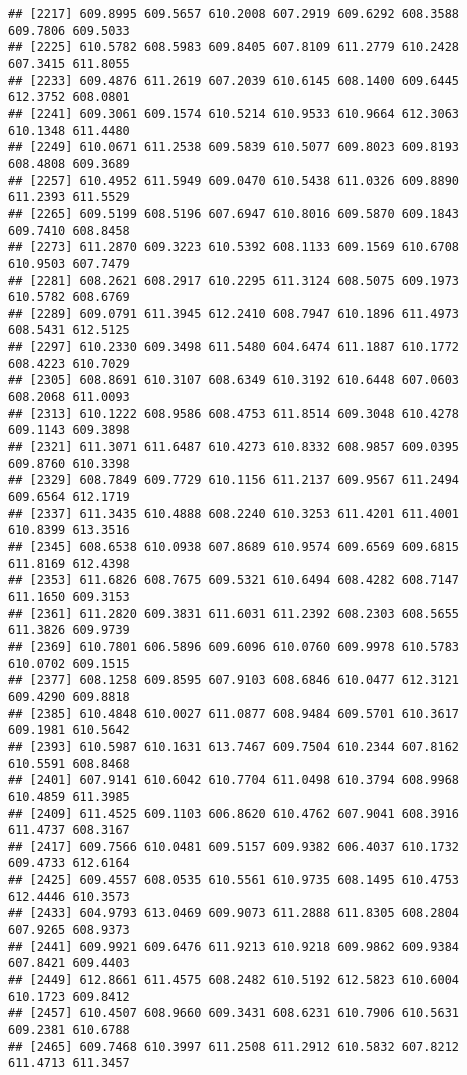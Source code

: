 \documentclass[
]{article}
\begin{document}
\begin{verbatim}
## [2217] 609.8995 609.5657 610.2008 607.2919 609.6292 608.3588 609.7806 609.5033
## [2225] 610.5782 608.5983 609.8405 607.8109 611.2779 610.2428 607.3415 611.8055
## [2233] 609.4876 611.2619 607.2039 610.6145 608.1400 609.6445 612.3752 608.0801
## [2241] 609.3061 609.1574 610.5214 610.9533 610.9664 612.3063 610.1348 611.4480
## [2249] 610.0671 611.2538 609.5839 610.5077 609.8023 609.8193 608.4808 609.3689
## [2257] 610.4952 611.5949 609.0470 610.5438 611.0326 609.8890 611.2393 611.5529
## [2265] 609.5199 608.5196 607.6947 610.8016 609.5870 609.1843 609.7410 608.8458
## [2273] 611.2870 609.3223 610.5392 608.1133 609.1569 610.6708 610.9503 607.7479
## [2281] 608.2621 608.2917 610.2295 611.3124 608.5075 609.1973 610.5782 608.6769
## [2289] 609.0791 611.3945 612.2410 608.7947 610.1896 611.4973 608.5431 612.5125
## [2297] 610.2330 609.3498 611.5480 604.6474 611.1887 610.1772 608.4223 610.7029
## [2305] 608.8691 610.3107 608.6349 610.3192 610.6448 607.0603 608.2068 611.0093
## [2313] 610.1222 608.9586 608.4753 611.8514 609.3048 610.4278 609.1143 609.3898
## [2321] 611.3071 611.6487 610.4273 610.8332 608.9857 609.0395 609.8760 610.3398
## [2329] 608.7849 609.7729 610.1156 611.2137 609.9567 611.2494 609.6564 612.1719
## [2337] 611.3435 610.4888 608.2240 610.3253 611.4201 611.4001 610.8399 613.3516
## [2345] 608.6538 610.0938 607.8689 610.9574 609.6569 609.6815 611.8169 612.4398
## [2353] 611.6826 608.7675 609.5321 610.6494 608.4282 608.7147 611.1650 609.3153
## [2361] 611.2820 609.3831 611.6031 611.2392 608.2303 608.5655 611.3826 609.9739
## [2369] 610.7801 606.5896 609.6096 610.0760 609.9978 610.5783 610.0702 609.1515
## [2377] 608.1258 609.8595 607.9103 608.6846 610.0477 612.3121 609.4290 609.8818
## [2385] 610.4848 610.0027 611.0877 608.9484 609.5701 610.3617 609.1981 610.5642
## [2393] 610.5987 610.1631 613.7467 609.7504 610.2344 607.8162 610.5591 608.8468
## [2401] 607.9141 610.6042 610.7704 611.0498 610.3794 608.9968 610.4859 611.3985
## [2409] 611.4525 609.1103 606.8620 610.4762 607.9041 608.3916 611.4737 608.3167
## [2417] 609.7566 610.0481 609.5157 609.9382 606.4037 610.1732 609.4733 612.6164
## [2425] 609.4557 608.0535 610.5561 610.9735 608.1495 610.4753 612.4446 610.3573
## [2433] 604.9793 613.0469 609.9073 611.2888 611.8305 608.2804 607.9265 608.9373
## [2441] 609.9921 609.6476 611.9213 610.9218 609.9862 609.9384 607.8421 609.4403
## [2449] 612.8661 611.4575 608.2482 610.5192 612.5823 610.6004 610.1723 609.8412
## [2457] 610.4507 608.9660 609.3431 608.6231 610.7906 610.5631 609.2381 610.6788
## [2465] 609.7468 610.3997 611.2508 611.2912 610.5832 607.8212 611.4713 611.3457

\end{verbatim}
\end{document}

